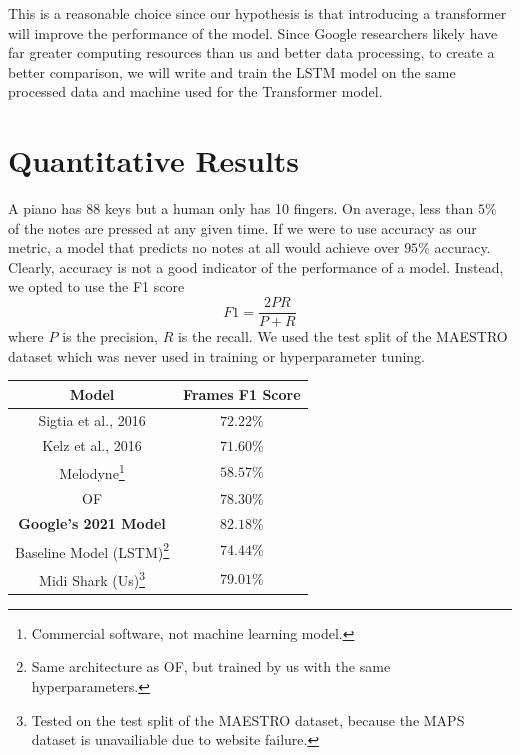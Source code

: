 \documentclass[a4paper,twocolumn,10pt]{article}
\begin{document}
This is a reasonable choice since our hypothesis is that introducing a transformer will improve the performance of the model. Since Google researchers likely have far greater computing resources than us and better data processing, to create a better comparison, we will write and train the LSTM model on the same processed data and machine used for the Transformer model.  



\section{Quantitative Results}

A piano has 88 keys but a human only has 10 fingers. On average, less than $5\%$ of the notes are pressed at any given time. If we were to use accuracy as our metric, a model that predicts no notes at all would achieve over $95\%$ accuracy. Clearly, accuracy is not a good indicator of the performance of a model. Instead, we opted to use the F1 score
\begin{equation}
  F1 = \frac{2PR}{P+R}
\end{equation}
where $P$ is the precision, $R$ is the recall. We used the test split of the MAESTRO dataset which was never used in training or hyperparameter tuning.

\begin{table}
  \begin{minipage}{\linewidth}
    \centering
    \begin{tabular}{|c|c|}
        \hline
        Model& Frames F1 Score \\
        \hline
        Sigtia et al., 2016 & \(72.22\%\)\\
        \hline
        Kelz et al., 2016 & \(71.60\%\)\\
        \hline
        Melodyne\footnote[1]{Commercial software, not machine learning model.} & \(58.57\%\)\\
        \hline
        OF & \(78.30\%\)\\
        \hline
        \textbf{Google’s 2021 Model} & \(\mathbf{82.18\%}\)\\
        \hline
        Baseline Model (LSTM)\footnotemark[2]\footnote[1]{Same architecture as OF, but trained by us with the same hyperparameters.} & \(74.44\%\)\\
        \hline
        Midi Shark (Us)\footnote{Tested on the test split of the MAESTRO dataset, because the MAPS dataset is unavailiable due to website failure.} & \(79.01\%\)\\
        \hline
    \end{tabular}
  \end{minipage}
\end{table}
\end{document}
